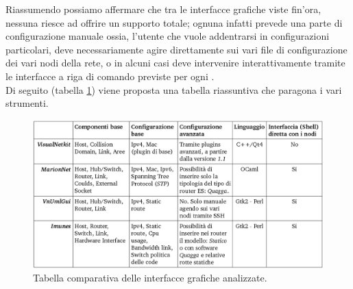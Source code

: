 Riassumendo possiamo affermare che tra le interfacce grafiche viste fin'ora, nessuna riesce ad offrire un supporto totale; ognuna infatti prevede una parte di configurazione manuale ossia, l'utente che vuole addentrarsi in configurazioni particolari, deve necessariamente agire direttamente sui vari file di configurazione dei vari nodi della rete, o in alcuni casi deve intervenire interattivamente tramite le interfacce a riga di comando previste per ogni \virtualmachine{}. \\
Di seguito (tabella \ref{figura:gui_compare}) viene proposta una tabella riassuntiva che paragona i vari strumenti.

\begin{figure}[!htb]
	\centering
	\includegraphics[width=12.7cm]{images/tabella_comparativa.png}
	\caption{Tabella comparativa delle interfacce grafiche analizzate.}
	\label{figura:gui_compare}
	
\end{figure}

